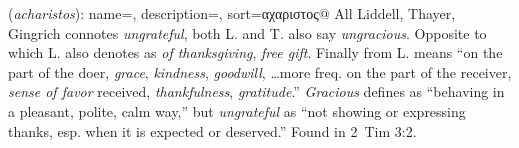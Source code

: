 \item[Ungrateful,]

(\textit{acharistos}):
{
    name=,
    description={},
    sort=αχαριστος@
}
All Liddell, Thayer, Gingrich connotes \emph{ungrateful}, both L. and T. also say \emph{ungracious}. Opposite to  which L. also denotes as \emph{of thanksgiving}, \emph{free gift}. Finally  from L. means ``on the part of the doer, \emph{grace}, \emph{kindness}, \emph{goodwill}, \ldots more freq. on the part of the receiver, \emph{sense of favor} received, \emph{thankfulness}, \emph{gratitude}.'' 
\emph{Gracious} defines as ``behaving in a pleasant, polite, calm way,'' but \emph{ungrateful} as ``not showing or expressing thanks, esp. when it is expected or deserved.''
Found in 2~Tim 3:2.
